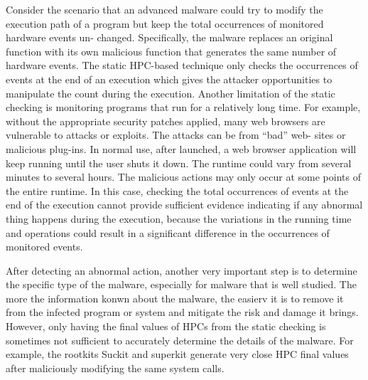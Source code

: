 \documentclass[12pt]{report}
\begin{document}
Consider the scenario that an advanced malware could try to modify the execution
path of a program but keep the total occurrences of monitored hardware events un-
changed. Specifically, the malware replaces an original function with its own malicious
function that generates the same number of hardware events. The static HPC-based
technique only checks the occurrences of events at the end of an execution which gives
the attacker opportunities to manipulate the count during the execution. Another
limitation of the static checking is monitoring programs that run for a relatively
long time. For example, without the appropriate security patches applied, many web
browsers are vulnerable to attacks or exploits. The attacks can be from “bad” web-
sites or malicious plug-ins. In normal use, after launched, a web browser application
will keep running until the user shuts it down. The runtime could vary from several
minutes to several hours. The malicious actions may only occur at some points of the
entire runtime. In this case, checking the total occurrences of events at the end of the
execution cannot provide sufficient evidence indicating if any abnormal thing happens
during the execution, because the variations in the running time and operations could
result in a significant difference in the occurrences of monitored events.

After detecting an abnormal action, another very important step is to determine
the specific type of the malware, especially for malware that is well studied. The
more the information konwn about the malware, the easierv it is to remove it from the
infected program or system and mitigate the risk and damage it brings. However, only
having the final values of HPCs from the static checking is sometimes not sufficient to
accurately determine the details of the malware. For example, the rootkits Suckit and superkit generate very close
HPC final values after maliciously modifying the same system calls.
\end{document}
